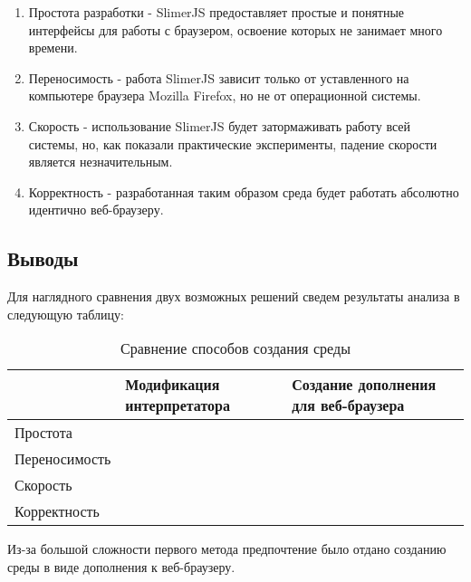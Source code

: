 	\begin{enumerate}
		\item Простота разработки - SlimerJS предоставляет простые и понятные интерфейсы для работы с браузером, освоение которых не занимает много времени.
		\item Переносимость - работа SlimerJS зависит только от уставленного на компьютере браузера Mozilla Firefox, но не от операционной системы.
		\item Скорость - использование SlimerJS будет затормаживать работу всей системы, но, как показали практические эксперименты, падение скорости является незначительным.
		\item Корректность - разработанная таким образом среда будет работать абсолютно идентично веб-браузеру.
	\end{enumerate}

\subsection{Выводы}
	Для наглядного сравнения двух возможных решений сведем результаты анализа в следующую таблицу:

	\begin{table}[h]
		\centering
		\caption{Сравнение способов создания среды}
	\begin{tabular}{|l|l|l|}
	\hline
	              & Модификация интерпретатора                      & Создание дополнения для веб-браузера \\ \hline
	Простота      & \cellcolor[HTML]{CB0000}                        & \cellcolor[HTML]{32CB00}             \\ \hline
	Переносимость & \cellcolor[HTML]{CB0000}                        & \cellcolor[HTML]{32CB00}             \\ \hline
	Скорость      & \cellcolor[HTML]{32CB00} 						& \cellcolor[HTML]{FFC702}             \\ \hline
	Корректность  & \cellcolor[HTML]{32CB00}                        & \cellcolor[HTML]{32CB00}             \\ \hline
	\end{tabular}
	\end{table}


	Из-за большой сложности первого метода предпочтение было отдано созданию среды в виде дополнения к веб-браузеру.



